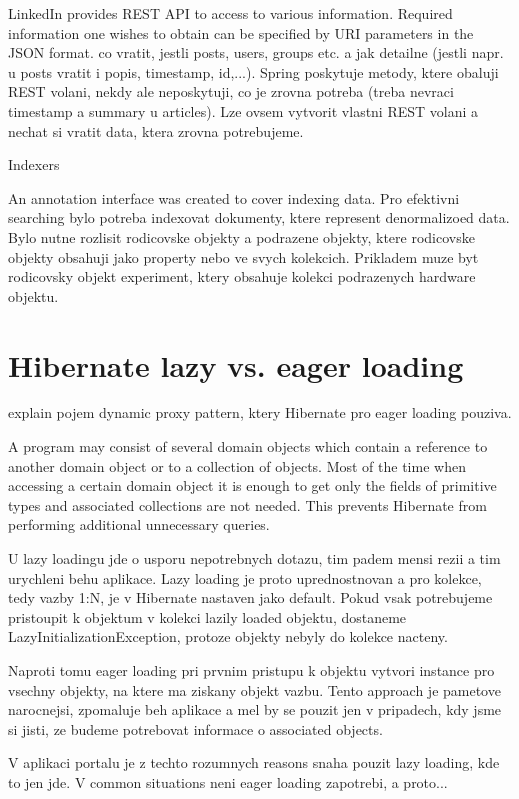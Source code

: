 \documentclass[12pt, oneside, a4paper]{book}
\begin{document}
LinkedIn provides REST API to access to various information. Required information one wishes to obtain can be specified by URI parameters in the JSON format. 
co vratit, jestli posts, users, groups
etc. a jak detailne (jestli napr. u posts vratit i popis,
timestamp, id,...). Spring poskytuje metody, ktere obaluji REST volani,
nekdy ale neposkytuji, co je zrovna potreba (treba nevraci
timestamp a summary u articles). Lze ovsem vytvorit
vlastni REST volani a nechat si vratit data, ktera zrovna potrebujeme.

Indexers

An annotation interface was created to cover indexing data. 
Pro efektivni
searching bylo potreba indexovat dokumenty, ktere represent
denormalizoed data. Bylo nutne rozlisit rodicovske objekty a
podrazene objekty, ktere rodicovske objekty obsahuji jako
property nebo ve svych kolekcich. Prikladem muze byt rodicovsky
objekt experiment, ktery obsahuje kolekci podrazenych hardware
objektu.


\section{Hibernate lazy vs. eager loading}

explain pojem dynamic proxy pattern, ktery Hibernate pro eager
loading pouziva.

A program may consist of several domain objects which contain a reference
to another domain object or to a collection of objects. Most of the
time when accessing a certain domain object it is enough to get only
the fields of primitive types and associated collections are not needed.
This prevents Hibernate from performing additional unnecessary queries.

U lazy loadingu jde o usporu nepotrebnych dotazu, tim padem
mensi rezii a tim urychleni behu aplikace. Lazy loading je proto
uprednostnovan a pro kolekce, tedy vazby 1:N, je v Hibernate
nastaven jako default. Pokud vsak potrebujeme pristoupit
k objektum v kolekci lazily loaded objektu, dostaneme LazyInitializationException,
protoze objekty nebyly do kolekce nacteny.

Naproti tomu eager loading pri prvnim pristupu k objektu vytvori
instance pro vsechny objekty, na ktere ma ziskany objekt vazbu. Tento
approach je pametove narocnejsi, zpomaluje
beh aplikace a mel by se pouzit jen v pripadech, kdy jsme
si jisti, ze budeme potrebovat informace o associated objects.

V aplikaci portalu je z techto rozumnych reasons snaha pouzit lazy
loading, kde to jen jde. V common situations neni eager loading
zapotrebi, a proto... 
\end{document}

